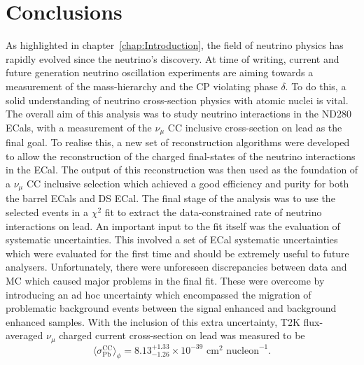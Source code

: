 \section{Conclusions}
\label{sec:Conclusions}
As highlighted in chapter~\ref{chap:Introduction}, the field of neutrino physics has rapidly evolved since the neutrino's discovery.  At time of writing, current and future generation neutrino oscillation experiments are aiming towards a measurement of the mass-hierarchy and the CP violating phase $\delta$.  To do this, a solid understanding of neutrino cross-section physics with atomic nuclei is vital. 
\newline
\newline
The overall aim of this analysis was to study neutrino interactions in the ND280 ECals, with a measurement of the $\nu_\mu$ CC inclusive cross-section on lead as the final goal.  To realise this, a new set of reconstruction algorithms were developed to allow the reconstruction of the charged final-states of the neutrino interactions in the ECal.  The output of this reconstruction was then used as the foundation of a $\nu_\mu$ CC inclusive selection which achieved a good efficiency and purity for both the barrel ECals and DS ECal.  The final stage of the analysis was to use the selected events in a $\chi^2$ fit to extract the data-constrained rate of neutrino interactions on lead.  An important input to the fit itself was the evaluation of systematic uncertainties.  This involved a set of ECal systematic uncertainties which were evaluated for the first time and should be extremely useful to future analysers.
\newline
\newline
Unfortunately, there were unforeseen discrepancies between data and MC which caused major problems in the final fit.  These were overcome by introducing an ad hoc uncertainty which encompassed the migration of problematic background events between the signal enhanced and background enhanced samples.  With the inclusion of this extra uncertainty,  T2K flux-averaged $\nu_\mu$ charged current cross-section on lead was measured to be 
\begin{equation}
\langle \sigma^{\textrm{CC}}_{\textrm{Pb}} \rangle_{\phi} = 8.13^{+1.33}_{-1.26} \times 10^{-39} \textrm{ cm}^2 \textrm{ nucleon}^{-1}.
\end{equation}


